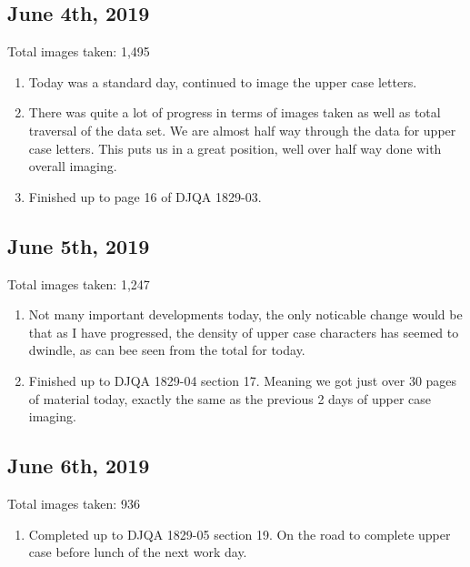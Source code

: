 \documentclass[12pt]{article} %
\begin{document}
\subsection{June 4th, 2019}
Total images taken: 1,495 \newline
\noindent\makebox[\linewidth]{\rule{15cm}{0.4pt}}
\begin{enumerate}[label = (\roman*)]
\item Today was a standard day, continued to image the upper case letters.
\item There was quite a lot of progress in terms of images taken as well as total traversal of the data set. We are almost half way through the data for upper case letters. This puts us in a great position, well over half way done with overall imaging.
\item Finished up to page 16 of DJQA 1829-03.
\end{enumerate}

\subsection{June 5th, 2019}
Total images taken: 1,247 \newline
\noindent\makebox[\linewidth]{\rule{15cm}{0.4pt}}
\begin{enumerate}[label = (\roman*)]
\item Not many important developments today, the only noticable change would be that as I have progressed, the density of upper case characters has seemed to dwindle, as can bee seen from the total for today.
\item Finished up to  DJQA 1829-04 section 17. Meaning we got just over 30 pages of material today, exactly the same as the previous 2 days of upper case imaging.
\end{enumerate}

\subsection{June 6th, 2019}
Total images taken: 936 \newline
\noindent\makebox[\linewidth]{\rule{15cm}{0.4pt}}
\begin{enumerate}[label = (\roman*)]
\item Completed up to DJQA 1829-05 section 19. On the road to complete upper case before lunch of the next work day.
\end{enumerate}
\end{document}
